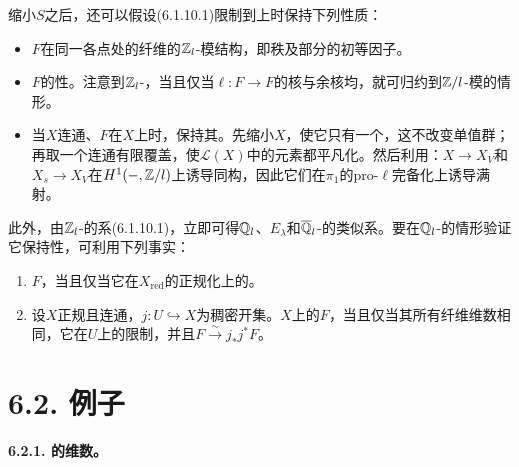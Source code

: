 缩小$S$之后，还可以假设(6.1.10.1)限制到上时保持下列性质：
\begin{itemize}
\item $F$在同一各点处的纤维的$\mathbb Z_l$-模结构，即秩及部分的初等因子。
\item $F$的性。注意到$\mathbb Z_l$-，当且仅当$\ell:F\to F$的核与余核均，就可归约到$\mathbb Z/l$-模的情形。
\item 当$X$连通、$F$在$X$上时，保持其。先缩小$X$，使它只有一个，这不改变单值群；再取一个连通有限覆盖，使$\mathcal L(X)$中的元素都平凡化。然后利用：$X\to X_V$和$X_s\to X_V$在$H^1(-,\mathbb Z/l)$上诱导同构，因此它们在$\pi_1$的pro-$\ell$完备化上诱导满射。
\end{itemize}
此外，由$\mathbb Z_l$-的系(6.1.10.1)，立即可得$\mathbb Q_l$、$E_\lambda$和$\overline{\mathbb Q}_l$-的类似系。要在$\mathbb Q_l$-的情形验证它保持性，可利用下列事实：
\begin{enumerate}[label=(\alph*)]
\item $F$，当且仅当它在$X_{\mathrm{red}}$的正规化上的。
\item 设$X$正规且连通，$j:U\hookrightarrow X$为稠密开集。$X$上的$F$，当且仅当其所有纤维维数相同，它在$U$上的限制，并且$F\xrightarrow{\sim}j_*j^*F$。
\end{enumerate}

\section*{6.2. 例子}
\par\medskip\noindent\textbf{6.2.1. 的维数。}

